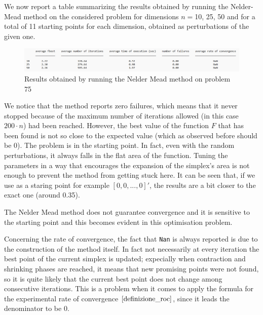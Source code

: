 We now report a table summarizing the results obtained by running the Nelder-Mead method
on the considered problem for dimensions $n=$10, 25, 50 and for a total of 11 starting 
points for each dimension, obtained as perturbations of the given one.

\begin{figure}[H]
    \centering
    \includegraphics[width=1\textwidth]{img/pb75_table_SX.png}
    \caption{Results obtained by running the Nelder Mead method on problem 75} 
    \label{pb 75 table SX}
\end{figure}

We notice that the method reports zero failures, which means that it never stopped because of the maximum 
number of iterations allowed (in this case $200\cdot n$) had been reached. However, the best value of the 
function $F$ that has been found is not so close to the expected value (which as observed before should be 0).
The problem is in the starting point. In fact, even with the random perturbations, it always falls in the flat area 
of the function. Tuning the parameters in a way that encourages the expansion of the simplex's area is not enough 
to prevent the method from getting stuck here. It can be seen that, if we use as a staring point for example $[0,0,...,0]'$, 
the results are a bit closer to the exact one (around 0.35). 

The Nelder Mead method does not guarantee convergence and it is sensitive to the starting point and this becomes evident 
in this optimisation problem.

Concerning the rate of convergence, the fact that \verb+Nan+ is always reported is due to the construction of the method
itself. In fact not necessarily at every iteration the best point of the current simplex is updated; expecially when contraction
and shrinking phases are reached, it means that new promising points were not found, so it is quite likely that the current best point
does not change among consecutive iterations. This is a problem when it comes to apply the formula for the experimental rate of 
convergence $\eqref{definizione_roc}$, since it leads the denominator to be 0.

\medskip
